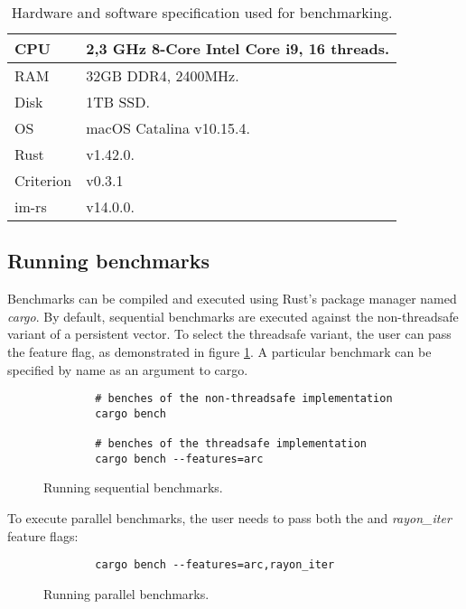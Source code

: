 \begin{table}[!htbp]
    \centering

    \begin{tabular} { |l| p{11cm} | }
        \hline CPU & 2,3 GHz 8-Core Intel Core i9, 16 threads. \\ \hline
        RAM & 32GB DDR4, 2400MHz. \\ \hline
        Disk & 1TB SSD. \\ \hline
        OS & macOS Catalina v10.15.4. \\ \hline
        Rust & v1.42.0. \\ \hline
        Criterion & v0.3.1 \\ \hline
        im-rs & v14.0.0. \\ \hline
    \end{tabular}

    \label{tab:exec-environment}
    \caption{Hardware and software specification used for benchmarking.}
\end{table}

\subsection{Running benchmarks}
Benchmarks can be compiled and executed using Rust's package manager named \emph{cargo}. By default, sequential benchmarks are executed against the non-threadsafe variant of a persistent vector. To select the threadsafe variant, the user can pass the \arc{} feature flag, as demonstrated in figure \ref{fig:sequential-benches}. A particular benchmark can be specified by name as an argument to cargo.

\begin{figure}[!htbp]
    \centering

    \begin{verbatim}
        # benches of the non-threadsafe implementation
        cargo bench

        # benches of the threadsafe implementation
        cargo bench --features=arc
    \end{verbatim}

    \caption{Running sequential benchmarks.}
    \label{fig:sequential-benches}
\end{figure}

To execute parallel benchmarks, the user needs to pass both the \arc{} and \emph{rayon\_iter} feature flags:
\begin{figure}[!htbp]
    \centering

    \begin{verbatim}
        cargo bench --features=arc,rayon_iter
    \end{verbatim}

    \caption{Running parallel benchmarks.}
    \label{fig:parallel-benches}
\end{figure}

